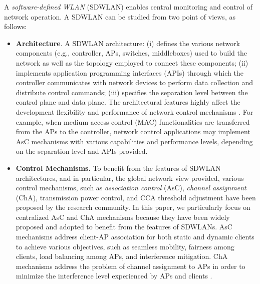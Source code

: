 A \textit{software-defined WLAN} (SDWLAN) enables central monitoring and control of network operation.
A SDWLAN can be studied from two point of views, as follows:


\begin{itemize}
    \item  \textbf{Architecture}. A SDWLAN architecture: (i) defines the various network components (e.g., controller, APs, switches, middleboxes) used to build the network as well as the topology employed to connect these components;
    (ii) implements application programming interfaces (APIs) through which the controller communicates with network devices to perform data collection and distribute control commands;
    (iii) specifies the separation level between the control plane and data plane.
    The architectural features highly affect the development flexibility and performance of network control mechanisms \cite{Primitives,DenseAP,OpenSDWN,CloudMAC}.
    For example, when medium access control (MAC) functionalities are transferred from the APs to the controller, network control applications may implement AsC mechanisms with various capabilities and performance levels, depending on the separation level and APIs provided.
    \item \textbf{Control Mechanisms.} To benefit from the features of SDWLAN architectures, and in particular, the global network view provided, various control mechanisms, such as \textit{association control} (AsC), \textit{channel assignment }(ChA), transmission power control, and CCA threshold adjustment have been proposed by the research community.
    In this paper, we particularly focus on centralized AsC and ChA mechanisms because they have been widely proposed and adopted to benefit from the features of SDWLANs.
    AsC mechanisms address client-AP association for both static and dynamic clients to achieve various objectives, such as seamless mobility, fairness among clients, load balancing among APs, and interference mitigation. %
    ChA mechanisms address the problem of channel assignment to APs in order to minimize the interference level experienced by APs and clients  \cite{Measurement-CA-WCNC-10,CAPWAP-based-CA-11,802.11ac-PCA}. %
\end{itemize}




